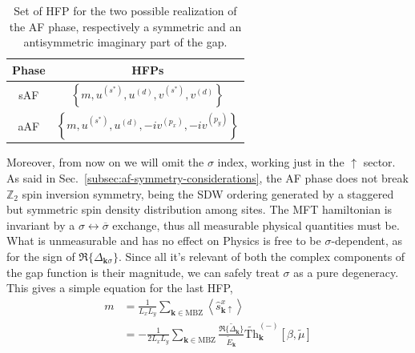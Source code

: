 \begin{table}
	\centering
	\begin{tabular}{c c}
		\textbf{Phase} & \textbf{HFPs} \\
		\midrule
		sAF & $\left\lbrace 
			m, u^{(s^*)}, u^{(d)}, v^{(s^*)}, v^{(d)}
		\right\rbrace$ \\[0.7em]
		aAF & $\left\lbrace
			m, u^{(s^*)}, u^{(d)}, -iv^{(p_x)}, -iv^{(p_y)}
		\right\rbrace$ \\
		\midrule
	\end{tabular}
	\caption{Set of HFP for the two possible realization of the AF phase, respectively a symmetric and an antisymmetric imaginary part of the gap.}
	\label{tab:saf-aaf-hfps}
\end{table}

Moreover, from now on we will omit the $\sigma$ index, working just in the $\uparrow$ sector. As said in Sec.~\ref{subsec:af-symmetry-considerations}, the AF phase does not break $\mathbb{Z}_2$ spin inversion symmetry, being the SDW ordering generated by a staggered but symmetric spin density distribution among sites. The MFT hamiltonian is invariant by a $\sigma \leftrightarrow \overline{\sigma}$ exchange, thus all measurable physical quantities must be. What is unmeasurable and has no effect on Physics is free to be $\sigma$-dependent, as for the sign of $\Re\lbrace\Delta_{\mathbf{k}\sigma}\rbrace$. Since all it's relevant of both the complex components of the gap function is their magnitude, we can safely treat $\sigma$ as a pure degeneracy. This gives a simple equation for the last HFP,
\begin{align}
	m &= \frac{1}{L_xL_y} \sum_{\mathbf{k} \in \mathrm{MBZ}} \left\langle
	\hat s_{\mathbf{k}\uparrow}^x
	\right\rangle \nonumber \\
	&= -\frac{1}{2L_xL_y} \sum_{\mathbf{k} \in \mathrm{MBZ}} \frac{
		\Re\lbrace\tilde{\Delta}_\mathbf{k}\rbrace
	}{\tilde{E}_\mathbf{k}} \tilde{\mathrm{Th}}_\mathbf{k}^{(-)}[\beta,\tilde{\mu}] \label{eq:af-m-self-consistency}
\end{align}
\todo

